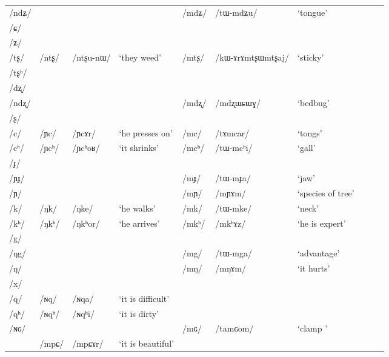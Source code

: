 \documentclass[12pt]{article}
\newcommand{\ipa}[1]{\mbox{\phon/#1/}}
\newcommand{\deux}[1]{\ipa{#1}\addtocounter{2clusters}{1}}
\newcommand{\trois}[1]{\ipa{#1}\addtocounter{3clusters}{1}}
\begin{document}
\begin{table}
\begin{tabular}{llllllllll}
\ipa{ndʑ}  & 	  & 	  & 	  & 	 \deux{mdʑ}  & 	 \ipa{tɯ-mdʑu}  & 	 `tongue' \\  
\ipa{ɕ}  & 	  & 	  & 	  & 	  & 	  & 	 \\  
\ipa{ʑ}  & 	  & 	  & 	  & 	  & 	  & 	 \\  
\ipa{tʂ}  & 	 \deux{ntʂ}  & 	 \ipa{ntʂu-nɯ}  & 	 `they weed'  & 	 \deux{mtʂ}  & 	 \ipa{kɯ-ɤrɤmtʂɯmtʂaj}  & 	 `sticky' \\  
\ipa{tʂʰ}  & 	  & 	  & 	  & 	  & 	  & 	 \\  
\ipa{dʐ}  & 	  & 	  & 	  & 	  & 	  & 	 \\  
\ipa{ndʐ}  & 	  & 	  & 	  & 	 \deux{mdʐ}  & 	 \ipa{mdʐɯɕɯɣ}  & 	 `bedbug' \\  
\ipa{ʂ}  & 	  & 	  & 	  & 	  & 	  & 	 \\  
\ipa{c}  & 	 \deux{ɲc}  & 	 \ipa{ɲcɤr}  & 	 `he presses on'  & 	 \deux{mc}  & 	 \ipa{tɤmcar}  & 	 `tongs' \\  
\ipa{cʰ}  & 	 \deux{ɲcʰ}  & 	 \ipa{ɲcʰoʁ}  & 	 `it shrinks'  & 	 \deux{mcʰ}  & 	 \ipa{tɯ-mcʰi}  & 	 `gall' \\  
\ipa{ɟ}  & 	  & 	  & 	  & 	  & 	  & 	 \\  
\ipa{ɲɟ}  & 	  & 	  & 	  & 	 \deux{mɟ}  & 	 \ipa{tɯ-mɟa}  & 	 `jaw' \\  
\ipa{ɲ}  & 	  & 	  & 	  & 	 \deux{mɲ}  & 	 \ipa{mɲɤm}  & 	 `species of tree' \\  
\ipa{k}  & 	 \deux{ŋk}  & 	 \ipa{ŋke}  & 	 `he walks'  & 	 \deux{mk}  & 	 \ipa{tɯ-mke}  & 	 `neck' \\  
\ipa{kʰ}  & 	 \deux{ŋkʰ}  & 	 \ipa{ŋkʰor}  & 	 `he arrives'  & 	 \deux{mkʰ}  & 	 \ipa{mkʰɤz}  & 	 `he is expert' \\  
\ipa{g}  & 	  & 	  & 	  & 	  & 	  & 	 \\  
\ipa{ŋg}  & 	  & 	  & 	  & 	 \deux{mg}  & 	 \ipa{tɯ-mga}  & 	 `advantage' \\  
\ipa{ŋ}  & 	  & 	  & 	  & 	 \deux{mŋ}  & 	 \ipa{mŋɤm}  & 	 `it hurts' \\  
\ipa{x}  & 	  & 	  & 	  & 	  & 	  & 	 \\  
\ipa{q}  & 	 \deux{ɴq}  & 	 \ipa{ɴqa}  & 	 `it is difficult'  & 	  & 	  & 	\\  
\ipa{qʰ}  & 	 \deux{ɴqʰ}  & 	 \ipa{ɴqʰi}  & 	 `it is dirty'  & 	  & 	  & 	\\  
\ipa{ɴɢ}  & 	  & 	  & 	  & 	 \deux{mɢ}  & 	 \ipa{tamɢom}  & 	 `clamp ' \\  
\midrule
&\trois{mpɕ} &\ipa{mpɕɤr} & `it is beautiful' \\
\bottomrule
\end{tabular}%
\end{table} 
\end{document}
